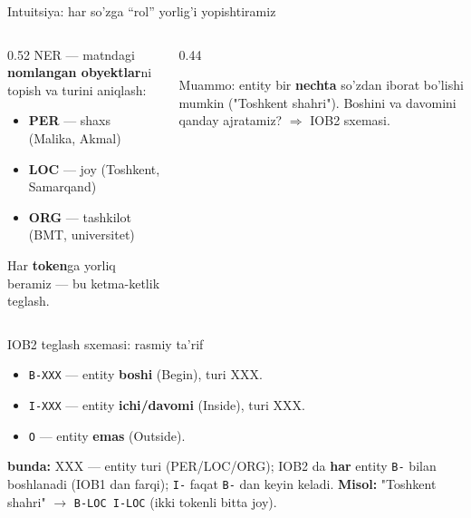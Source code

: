 \documentclass[aspectratio=169,11pt]{beamer}
\newcommand{\bunda}[1]{{\small\textbf{bunda:}\; #1}}
\begin{document}
\begin{frame}{Intuitsiya: har so'zga ``rol'' yorlig'i yopishtiramiz}
  \begin{columns}[T]
    \begin{column}{0.52\textwidth}
      \small
      NER --- matndagi \textbf{nomlangan obyektlar}ni topish va turini aniqlash:
      \begin{itemize}\setlength\itemsep{1pt}
        \item \textbf{PER} --- shaxs (Malika, Akmal)
        \item \textbf{LOC} --- joy (Toshkent, Samarqand)
        \item \textbf{ORG} --- tashkilot (BMT, universitet)
      \end{itemize}
      \vspace{4pt}
      Har \textbf{token}ga yorliq beramiz --- bu ketma-ketlik teglash.
    \end{column}
    \begin{column}{0.44\textwidth}
      \begin{tcolorbox}[okbox,top=2pt,bottom=2pt]
        \footnotesize
        Muammo: entity bir \textbf{nechta} so'zdan iborat bo'lishi mumkin
        ("Toshkent shahri"). Boshini va davomini qanday ajratamiz? $\Rightarrow$
        IOB2 sxemasi.
      \end{tcolorbox}
    \end{column}
  \end{columns}
\end{frame}

\begin{frame}{IOB2 teglash sxemasi: rasmiy ta'rif}
  \begin{tcolorbox}[defbox,title=Ta'rif: IOB2 teglari]
    \small
    \begin{itemize}\setlength\itemsep{2pt}
      \item \texttt{B-XXX} --- entity \textbf{boshi} (Begin), turi XXX.
      \item \texttt{I-XXX} --- entity \textbf{ichi/davomi} (Inside), turi XXX.
      \item \texttt{O} --- entity \textbf{emas} (Outside).
    \end{itemize}
  \end{tcolorbox}
  \vspace{3pt}
  \bunda{XXX --- entity turi (PER/LOC/ORG); IOB2 da \textbf{har} entity \texttt{B-}
  bilan boshlanadi (IOB1 dan farqi); \texttt{I-} faqat \texttt{B-} dan keyin keladi.}
  \vspace{4pt}
  \textbf{Misol:} "Toshkent shahri" $\to$ \texttt{B-LOC I-LOC} (ikki tokenli bitta joy).
\end{frame}
\end{document}
